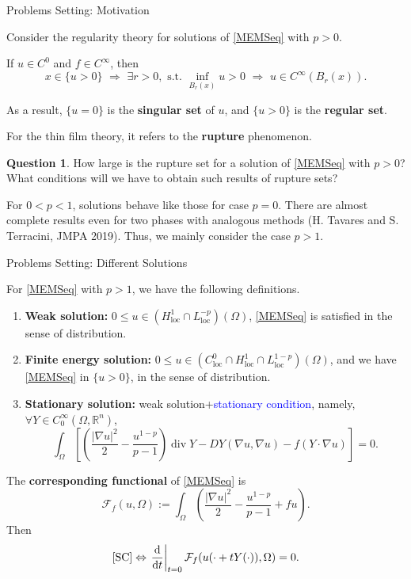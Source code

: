 \documentclass[11pt]{beamer}
\newcommand{\om}{\Omega}
\newcommand{\ud}{\mathrm{d}}
\newcommand{\be}{\begin{equation}}
\newcommand{\ee}{\end{equation}}
\newcommand{\cF}{\mathcal{F}}
\newcommand{\R}{\mathbb{R}}
\newcommand{\ift}{\infty}
\newcommand{\f}{\frac}
\newcommand{\Ra}{\Rightarrow}
\newcommand{\op}{\operatorname}
\newcommand{\na}{\nabla}
\DeclareMathOperator{\loc}{loc}
\def\({\left(}                 \def\){\right)}
\theoremstyle{plain}
\theoremstyle{definition}
\newtheorem{q}[thm]{Question}
\begin{document}
\begin{frame}{Problems Setting: Motivation}

Consider the regularity theory for solutions of \eqref{MEMSeq} with $ p>0 $.

\vspace{1em}

If $ u\in C^0 $ and $ f\in C^{\ift} $, then
$$
x\in\{u>0\}\,\,\Ra\,\,\exists r>0,\,\,\text{s.t.}\,\,\inf_{B_r(x)}u>0\,\,\Ra\,\, u\in C^{\ift}(B_r(x)).
$$

\vspace{1em}\pause

As a result, $ \{u=0\} $ is the \textbf{singular set} of $ u $, and $ \{u>0\} $ is the \textbf{regular set}.
\vspace{1em}

For the thin film theory, it refers to the \textbf{rupture} phenomenon.\pause

\begin{q}
How large is the rupture set for a solution of \eqref{MEMSeq} with $ p>0 $? What conditions will we have to obtain such results of rupture sets?
\end{q}\pause

For $ 0<p<1 $, solutions behave like those for case $ p=0 $. There are almost complete results even for two phases with analogous methods (H. Tavares and S. Terracini, JMPA 2019). Thus, we mainly consider the case $ p>1 $.

\end{frame}

\begin{frame}{Problems Setting: Different Solutions}

For \eqref{MEMSeq} with $ p>1 $, we have the following definitions.
\begin{enumerate}
\item\textbf{Weak solution:} $ 0\leq u\in(H_{\loc}^1\cap L_{\loc}^{-p})(\om) $, \eqref{MEMSeq} is satisfied in the sense of distribution.\pause
\item\textbf{Finite energy solution:} $ 0\leq u\in(C_{\loc}^0\cap H_{\loc}^1\cap L_{\loc}^{1-p})(\om) $, and we have \eqref{MEMSeq} in $ \{u>0\} $, in the sense of distribution.\pause
\item\textbf{Stationary solution:} weak solution+\textcolor{blue}{stationary condition}, namely, $ \forall Y\in C_0^{\ift}(\om,\R^n) $,
\be
\int_{\om}\left[\(\f{|\na u|^2}{2}-\f{u^{1-p}}{p-1}\)\op{div}Y-DY(\na u,\na u)-f(Y\cdot\na u)\right]=0.\label{SC}\tag{SC}
\ee
\end{enumerate}\pause
The \textbf{corresponding functional} of \eqref{MEMSeq} is
$$
\cF_f(u,\om):=\int_{\om}\(\f{|\na u|^2}{2}-\f{u^{1-p}}{p-1}+fu\).
$$
Then
$$
\text{\eqref{SC}}\Leftrightarrow\left.\f{\ud}{\ud t}\right|_{t=0}\cF_f(u(\cdot+tY(\cdot)),\om)=0.
$$

\end{frame}
\end{document}
